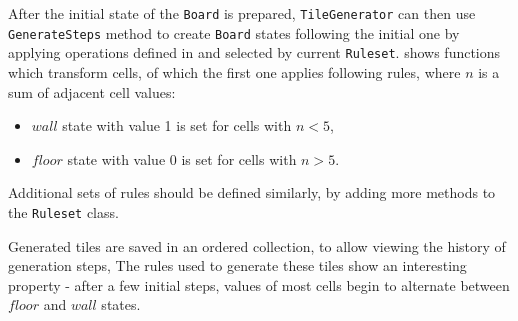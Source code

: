 \documentclass[12pt]{report}
\begin{document}
After the initial state of the \texttt{Board} is prepared, \texttt{TileGenerator} can then use \texttt{GenerateSteps} method to create \texttt{Board} states following the initial one by applying operations defined in and selected by current \texttt{Ruleset}.  shows functions which transform cells, of which the first one applies following rules, where $n$ is a sum of adjacent cell values:

\begin{itemize}
	\item $wall$ state with value 1 is set for cells with $n < 5$,
	\item $floor$ state with value 0 is set for cells with $n > 5$.
\end{itemize}

Additional sets of rules should be defined similarly, by adding more methods to the \texttt{Ruleset} class. 



Generated tiles are saved in an ordered collection, to allow viewing the history of generation steps, The rules used to generate these tiles show an interesting property - after a few initial steps, values of most cells begin to alternate between $floor$ and $wall$ states.
\end{document}
